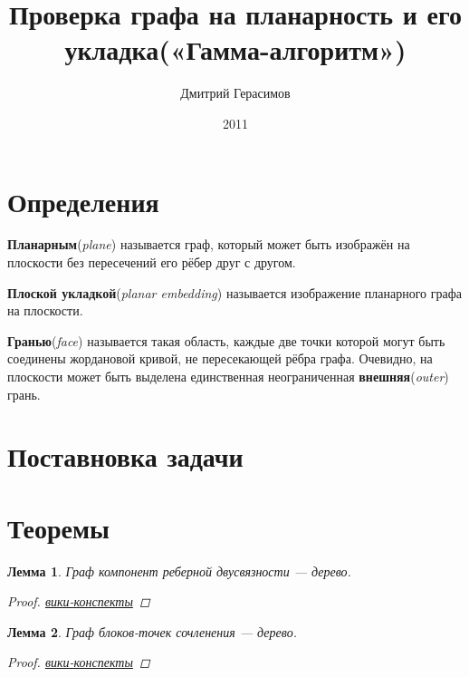 \documentclass[a4paper, 10pt]{article}
\newtheorem{mylemma}{Лемма}
\begin{document}
\title{Проверка графа на планарность и его укладка(«Гамма-алгоритм»)}
\author{Дмитрий Герасимов}
\date{2011}

\maketitle

\section{Определения}
{\bf Планарным}({\it plane}) называется граф, который может быть изображён на плоскости без пересечений его рёбер друг с другом.

{\bf Плоской укладкой}({\it planar embedding}) называется изображение планарного графа на плоскости.

{\bf Гранью}({\it face}) называется такая область, каждые две точки которой могут быть соединены жордановой кривой, не пересекающей рёбра графа. Очевидно, на плоскости может быть выделена единственная неограниченная {\bf внешняя}({\it outer}) грань.

\section{Поставновка задачи}

\section{Теоремы}

\begin{mylemma}
Граф компонент реберной двусвязности — дерево.
\begin{proof}
\href{http://neerc.ifmo.ru/mediawiki/index.php/%D0%93%D1%80%D0%B0%D1%84_%D0%BA%D0%BE%D0%BC%D0%BF%D0%BE%D0%BD%D0%B5%D0%BD%D1%82_%D1%80%D0%B5%D0%B1%D0%B5%D1%80%D0%BD%D0%BE%D0%B9_%D0%B4%D0%B2%D1%83%D1%81%D0%B2%D1%8F%D0%B7%D0%BD%D0%BE%D1%81%D1%82%D0%B8}{вики-конспекты}
\end{proof}
\end{mylemma}

\begin{mylemma}
Граф блоков-точек сочленения — дерево.
\begin{proof}
\href{http://neerc.ifmo.ru/mediawiki/index.php/%D0%93%D1%80%D0%B0%D1%84_%D0%B1%D0%BB%D0%BE%D0%BA%D0%BE%D0%B2-%D1%82%D0%BE%D1%87%D0%B5%D0%BA_%D1%81%D0%BE%D1%87%D0%BB%D0%B5%D0%BD%D0%B5%D0%BD%D0%B8%D1%8F}{вики-конспекты}
\end{proof}
\end{mylemma}
\end{document}
